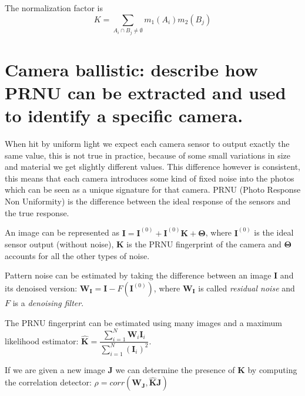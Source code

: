 \documentclass[a4paper, 12pt]{article}
\begin{document}
The normalization factor is
\begin{equation}
	K = \sum\limits_{A_i \cap B_j \neq \emptyset} m_1(A_i) m_2(B_j)
\end{equation}

\section{}

\section{}

\section{Camera ballistic: describe how PRNU can be extracted and used to identify a specific camera.}
When hit by uniform light we expect each camera sensor to output exactly the same value, this is not true in practice, because of some small variations in size and material we get slightly different values. This difference however is consistent, this means that each camera introduces some kind of fixed noise into the photos which can be seen as a unique signature for that camera. PRNU (Photo Response Non Uniformity) is the difference between the ideal response of the sensors and the true response.

An image can be represented as $\mathbf{I} = \mathbf{I}^{(0)} + \mathbf{I}^{(0)} \mathbf{K} + \mathbf{\Theta}$, where $\mathbf{I}^{(0)}$ is the ideal sensor output (without noise), $\mathbf{K}$ is the PRNU fingerprint of the camera and $\mathbf{\Theta}$ accounts for all the other types of noise.

Pattern noise can be estimated by taking the difference between an image $\mathbf{I}$ and its denoised version: $\mathbf{W_I} = \mathbf{I}- F\left(\mathbf{I}^{(0)}\right)$, where $\mathbf{W_I}$ is called \textit{residual noise} and $F$ is a \textit{denoising filter}.

The PRNU fingerprint can be estimated using many images and a maximum likelihood estimator: $\hat{\mathbf{K}} = \dfrac{\sum\limits_{i=1}^{N} \mathbf{W}_i \mathbf{I}_i}{\sum\limits_{i=1}^{N} \left( \mathbf{I}_i \right) ^2}$.

If we are given a new image $\mathbf{J}$ we can determine the presence of $\mathbf{K}$ by computing the correlation detector: $\rho = corr \left( \mathbf{W_J}, \mathbf{\hat{K}J} \right)$
\end{document}
